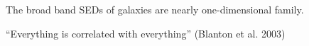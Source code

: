 \documentclass[letterpaper,landscape]{slides}
\begin{document}
\begin{slide}
\begin{center}
\end{center}
{\color{blue} The broad band SEDs of galaxies are nearly one-dimensional family.}

{\color{red} ``Everything is correlated with everything'' (Blanton et al. 2003)}
\vfill
\end{slide}
\end{document}
